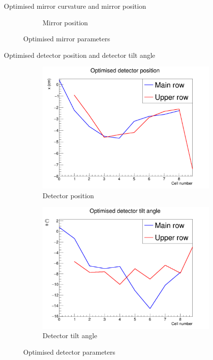 \documentclass{beamer}
\begin{document}
\begin{frame}{Optimised mirror curvature and mirror position}
\begin{figure}
\begin{subfigure}{0.5\textwidth}
      \caption{Mirror position}
    \end{subfigure}
    \caption{Optimised mirror parameters}
  \end{figure}
\end{frame}

\begin{frame}{Optimised detector position and detector tilt angle}
  \begin{figure}
    \centering
    \vspace{-0.2cm}
    \begin{subfigure}{0.5\textwidth}
      \includegraphics[width = 1.0\textwidth]{Plots/OptimisedDetPosition.png}
      \caption{Detector position}
    \end{subfigure}%
    \begin{subfigure}{0.5\textwidth}
      \includegraphics[width = 1.0\textwidth]{Plots/OptimisedDetTilt.png}
      \caption{Detector tilt angle}
    \end{subfigure}
    \caption{Optimised detector parameters}
  \end{figure}
\end{frame}
\end{document}

